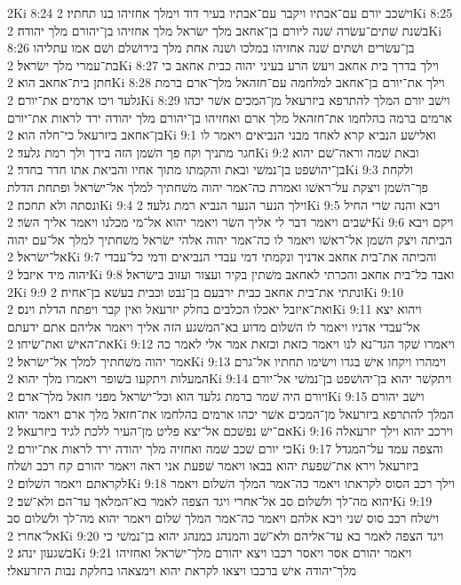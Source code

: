2Ki 8:24  וישׁכב יורם עם־אבתיו ויקבר עם־אבתיו בעיר דוד וימלך אחזיהו בנו תחתיו׃
2Ki 8:25  בשׁנת שׁתים־עשׂרה שׁנה ליורם בן־אחאב מלך ישׂראל מלך אחזיהו בן־יהורם מלך יהודה׃
2Ki 8:26  בן־עשׂרים ושׁתים שׁנה אחזיהו במלכו ושׁנה אחת מלך בירושׁלם ושׁם אמו עתליהו בת־עמרי מלך ישׂראל׃
2Ki 8:27  וילך בדרך בית אחאב ויעשׂ הרע בעיני יהוה כבית אחאב כי חתן בית־אחאב הוא׃
2Ki 8:28  וילך את־יורם בן־אחאב למלחמה עם־חזהאל מלך־ארם ברמת גלעד ויכו ארמים את־יורם׃
2Ki 8:29  וישׁב יורם המלך להתרפא ביזרעאל מן־המכים אשׁר יכהו ארמים ברמה בהלחמו את־חזהאל מלך ארם ואחזיהו בן־יהורם מלך יהודה ירד לראות את־יורם בן־אחאב ביזרעאל כי־חלה הוא׃
2Ki 9:1  ואלישׁע הנביא קרא לאחד מבני הנביאים ויאמר לו חגר מתניך וקח פך השׁמן הזה בידך ולך רמת גלעד׃
2Ki 9:2  ובאת שׁמה וראה־שׁם יהוא בן־יהושׁפט בן־נמשׁי ובאת והקמתו מתוך אחיו והביאת אתו חדר בחדר׃
2Ki 9:3  ולקחת פך־השׁמן ויצקת על־ראשׁו ואמרת כה־אמר יהוה משׁחתיך למלך אל־ישׂראל ופתחת הדלת ונסתה ולא תחכה׃
2Ki 9:4  וילך הנער הנער הנביא רמת גלעד׃
2Ki 9:5  ויבא והנה שׂרי החיל ישׁבים ויאמר דבר לי אליך השׂר ויאמר יהוא אל־מי מכלנו ויאמר אליך השׂר׃
2Ki 9:6  ויקם ויבא הביתה ויצק השׁמן אל־ראשׁו ויאמר לו כה־אמר יהוה אלהי ישׂראל משׁחתיך למלך אל־עם יהוה אל־ישׂראל׃
2Ki 9:7  והכיתה את־בית אחאב אדניך ונקמתי דמי עבדי הנביאים ודמי כל־עבדי יהוה מיד איזבל׃
2Ki 9:8  ואבד כל־בית אחאב והכרתי לאחאב משׁתין בקיר ועצור ועזוב בישׂראל׃
2Ki 9:9  ונתתי את־בית אחאב כבית ירבעם בן־נבט וכבית בעשׁא בן־אחיה׃
2Ki 9:10  ואת־איזבל יאכלו הכלבים בחלק יזרעאל ואין קבר ויפתח הדלת וינס׃
2Ki 9:11  ויהוא יצא אל־עבדי אדניו ויאמר לו השׁלום מדוע בא־המשׁגע הזה אליך ויאמר אליהם אתם ידעתם את־האישׁ ואת־שׂיחו׃
2Ki 9:12  ויאמרו שׁקר הגד־נא לנו ויאמר כזאת וכזאת אמר אלי לאמר כה אמר יהוה משׁחתיך למלך אל־ישׂראל׃
2Ki 9:13  וימהרו ויקחו אישׁ בגדו וישׂימו תחתיו אל־גרם המעלות ויתקעו בשׁופר ויאמרו מלך יהוא׃
2Ki 9:14  ויתקשׁר יהוא בן־יהושׁפט בן־נמשׁי אל־יורם ויורם היה שׁמר ברמת גלעד הוא וכל־ישׂראל מפני חזאל מלך־ארם׃
2Ki 9:15  וישׁב יהורם המלך להתרפא ביזרעאל מן־המכים אשׁר יכהו ארמים בהלחמו את־חזאל מלך ארם ויאמר יהוא אם־ישׁ נפשׁכם אל־יצא פליט מן־העיר ללכת לגיד ביזרעאל׃
2Ki 9:16  וירכב יהוא וילך יזרעאלה כי יורם שׁכב שׁמה ואחזיה מלך יהודה ירד לראות את־יורם׃
2Ki 9:17  והצפה עמד על־המגדל ביזרעאל וירא את־שׁפעת יהוא בבאו ויאמר שׁפעת אני ראה ויאמר יהורם קח רכב ושׁלח לקראתם ויאמר השׁלום׃
2Ki 9:18  וילך רכב הסוס לקראתו ויאמר כה־אמר המלך השׁלום ויאמר יהוא מה־לך ולשׁלום סב אל־אחרי ויגד הצפה לאמר בא־המלאך עד־הם ולא־שׁב׃
2Ki 9:19  וישׁלח רכב סוס שׁני ויבא אלהם ויאמר כה־אמר המלך שׁלום ויאמר יהוא מה־לך ולשׁלום סב אל־אחרי׃
2Ki 9:20  ויגד הצפה לאמר בא עד־אליהם ולא־שׁב והמנהג כמנהג יהוא בן־נמשׁי כי בשׁגעון ינהג׃
2Ki 9:21  ויאמר יהורם אסר ויאסר רכבו ויצא יהורם מלך־ישׂראל ואחזיהו מלך־יהודה אישׁ ברכבו ויצאו לקראת יהוא וימצאהו בחלקת נבות היזרעאלי׃
